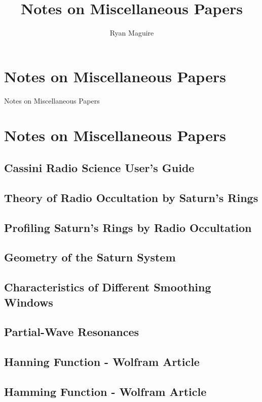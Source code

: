 \documentclass[crop=false,class=book,oneside]{standalone}
\begin{document}
    \ifx\ifresearchwhitinobservatory\undefined
        \title{Notes on Miscellaneous Papers}
        \author{Ryan Maguire}
        \date{\vspace{-5ex}}
        \maketitle
        \tableofcontents
        \chapter*{Notes on Miscellaneous Papers}
                        {Notes on Miscellaneous Papers}
        \setcounter{chapter}{1}
    \else
        \chapter{Notes on Miscellaneous Papers}
    \fi
    \section{Cassini Radio Science User's Guide}
        \label{sec:usrguide}

    \section{Theory of Radio Occultation by Saturn's Rings}

    \section{Profiling Saturn's Rings by Radio Occultation}
    \section{Geometry of the Saturn System}
    \section{Characteristics of Different Smoothing Windows}
    \section{Partial-Wave Resonances}
    \section{Hanning Function - Wolfram Article}
    \section{Hamming Function - Wolfram Article}
\end{document}
